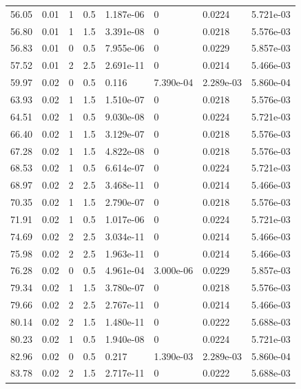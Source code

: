 \documentclass[preview]{standalone}
\begin{document}
{{\begin{tabular}{L{1.2cm}C{1.2cm} C{0.3cm}C{0.5cm} C{1.4cm}C{1.4cm} C{1.4cm}C{1.4cm}}
  56.05  &  0.01  & 1     & 0.5 &  1.187e-06  & 0  & 0.0224 &  5.721e-03   \\ 
  56.80  &  0.01  & 1     & 1.5 &  3.391e-08  & 0  & 0.0218 &  5.576e-03   \\ 
  56.83  &  0.01  & 0     & 0.5 &  7.955e-06  & 0  & 0.0229 &  5.857e-03   \\ 
  57.52  &  0.01  & 2     & 2.5 &  2.691e-11  & 0  & 0.0214 &  5.466e-03   \\ 
  59.97  &  0.02  & 0     & 0.5 &  0.116  & 7.390e-04  & 2.289e-03 &  5.860e-04   \\ 
  63.93  &  0.02  & 1     & 1.5 &  1.510e-07  & 0  & 0.0218 &  5.576e-03   \\ 
  64.51  &  0.02  & 1     & 0.5 &  9.030e-08  & 0  & 0.0224 &  5.721e-03   \\ 
  66.40  &  0.02  & 1     & 1.5 &  3.129e-07  & 0  & 0.0218 &  5.576e-03   \\ 
  67.28  &  0.02  & 1     & 1.5 &  4.822e-08  & 0  & 0.0218 &  5.576e-03   \\ 
  68.53  &  0.02  & 1     & 0.5 &  6.614e-07  & 0  & 0.0224 &  5.721e-03   \\ 
  68.97  &  0.02  & 2     & 2.5 &  3.468e-11  & 0  & 0.0214 &  5.466e-03   \\ 
  70.35  &  0.02  & 1     & 1.5 &  2.790e-07  & 0  & 0.0218 &  5.576e-03   \\ 
  71.91  &  0.02  & 1     & 0.5 &  1.017e-06  & 0  & 0.0224 &  5.721e-03   \\ 
  74.69  &  0.02  & 2     & 2.5 &  3.034e-11  & 0  & 0.0214 &  5.466e-03   \\ 
  75.98  &  0.02  & 2     & 2.5 &  1.963e-11  & 0  & 0.0214 &  5.466e-03   \\ 
  76.28  &  0.02  & 0     & 0.5 &  4.961e-04  & 3.000e-06  & 0.0229 &  5.857e-03   \\ 
  79.34  &  0.02  & 1     & 1.5 &  3.780e-07  & 0  & 0.0218 &  5.576e-03   \\ 
  79.66  &  0.02  & 2     & 2.5 &  2.767e-11  & 0  & 0.0214 &  5.466e-03   \\ 
  80.14  &  0.02  & 2     & 1.5 &  1.480e-11  & 0  & 0.0222 &  5.688e-03   \\ 
  80.23  &  0.02  & 1     & 0.5 &  1.940e-08  & 0  & 0.0224 &  5.721e-03   \\ 
  82.96  &  0.02  & 0     & 0.5 &  0.217  & 1.390e-03  & 2.289e-03 &  5.860e-04   \\ 
  83.78  &  0.02  & 2     & 1.5 &  2.717e-11  & 0  & 0.0222 &  5.688e-03   \\ 

\end{tabular}}}
\end{document}
